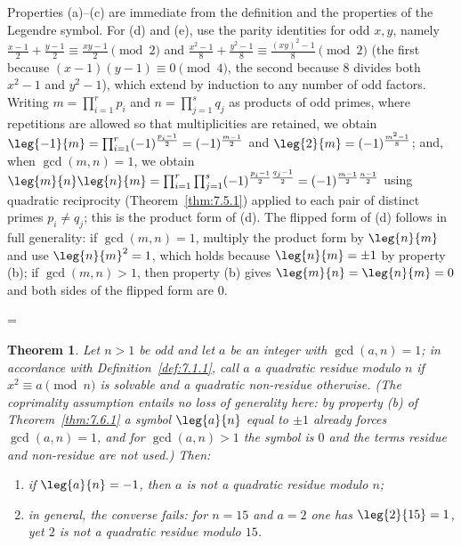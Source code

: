 \documentclass[11pt]{article}
\makeatletter
\theoremstyle{ntstyle}
\newtheorem{theorem}{Theorem}[subsection]
\let\nt@closedisplay\]
\def\nt@guardedclose{\@ifnextchar\par{\nt@closeafterpar}{\@ifnextchar\end{\postdisplaypenalty\@M\nt@closedisplay}{\nt@closedisplay}}}
\def\nt@closeafterpar\par{\@ifnextchar\par{\nt@closeafterpar}{\@ifnextchar\end{\postdisplaypenalty\@M\nt@closedisplay\par}{\nt@closedisplay\par}}}
\renewenvironment{proof}[1][\proofname]{\par
  \pushQED{\qed}\normalfont\topsep\medskipamount\edef\nt@afterproof{\@endparpenalty=\the\@endparpenalty\relax}\@beginparpenalty\@M\@endparpenalty\@M\let\]\nt@guardedclose\trivlist\item[]\textit{#1\@addpunct{.}} \ignorespaces}{\ifvmode\addpenalty\@M\fi\popQED\nt@afterproof\endtrivlist\@endpefalse}
\makeatother
\begin{document}
\begin{proof} Properties (a)--(c) are immediate from the
	definition and the properties of the Legendre symbol. For (d) and (e), use the parity identities for
	odd $x, y$, namely $\frac{x-1}{2} + \frac{y-1}{2}
		\equiv \frac{xy-1}{2} \pmod{2}$ and $\frac{x^2-1}{8} + \frac{y^2-1}{8}
		\equiv \frac{(xy)^2-1}{8} \pmod{2}$ (the first because $(x-1)(y-1)
		\equiv 0 \pmod{4}$, the second because $8$ divides both $x^2-1$ and $y^2-1$), which
	extend by induction to any number of odd factors. Writing $m=\prod_{i=1}^{r}p_i$ and
	$n=\prod_{j=1}^{s}q_j$ as products of odd primes, where repetitions
	are allowed so that multiplicities are retained, we obtain
	$\leg{-1}{m}=\prod_{i=1}^{r} (-1)^{\frac{p_i-1}{2}} =
		(-1)^{\frac{m-1}{2}}$ and $\leg{2}{m} =
		(-1)^{\frac{m^2-1}{8}}$; and, when $\gcd(m, n) = 1$, we obtain $\leg{m}{n}\leg{n}{m}=\prod_{i=1}^{r}\prod_{j=1}^{s}(-1)^{\frac{p_i-1}{2}\frac{q_j-1}{2}} =
		(-1)^{\frac{m-1}{2}\frac{n-1}{2}}$ using quadratic reciprocity (Theorem~\ref{thm:7.5.1}) applied to each pair of distinct primes $p_i \neq q_j$; this is
	the product form of (d). The flipped form of (d) follows in
	full generality: if $\gcd(m, n) = 1$, multiply the product form by
	$\leg{n}{m}$ and use $\leg{n}{m}^{2} = 1$, which holds because
	$\leg{n}{m} = \pm 1$ by property (b); if $\gcd(m, n) > 1$, then property (b)
	gives $\leg{m}{n} = \leg{n}{m} = 0$ and both sides of the flipped form
	are $0$.

\end{proof}
\begin{theorem}\label{thm:7.6.2} Let $n > 1$ be odd and let $a$ be an integer with
	$\gcd(a, n) = 1$; in accordance with Definition~\ref{def:7.1.1}, call $a$ a
	quadratic residue modulo $n$ if $x^{2} \equiv a \pmod{n}$ is solvable
	and a quadratic non-residue otherwise. (The coprimality assumption
	entails no loss of generality here: by property (b) of Theorem~\ref{thm:7.6.1} a symbol
	$\leg{a}{n}$ equal to $\pm 1$ already forces $\gcd(a, n) = 1$, and for
	$\gcd(a, n) > 1$ the symbol is $0$ and the terms residue and
	non-residue are not used.) Then:

	\begin{enumerate}[label={\alph*)}]
		\item if $\leg{a}{n} = -1$, then $a$ is not a quadratic residue modulo
		      $n$;
		\item in general, the converse fails: for $n = 15$ and $a = 2$ one has
		      $\leg{2}{15} = 1$, yet $2$ is not a quadratic residue modulo $15$.
	\end{enumerate}

\end{theorem}
\end{document}
